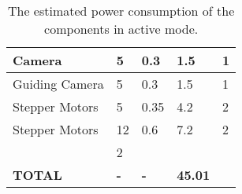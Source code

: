 \begin{center}
\begin{table}[H]
\begin{tabular}{|m{}|m{}|m{}|m{}|m{}|}
Camera                  & 5                               & 0.3                                 & 1.5                          & 1                 \\ \hline
Guiding Camera          & 5                               & 0.3                                 & 1.5                          & 1                 \\ \hline
Stepper Motors            & 5                              & 0.35                                & 4.2                          & 2                \\ \hline
Stepper Motors            & 12                              & 0.6                                & 7.2                          & 2                 \\ \hline                        & 2                \\ \hline
\textbf{TOTAL}          & \textbf{-}                      & \textbf{-}                   & \textbf{45.01}           &                   \\ \hline
\end{tabular}
\caption{The estimated power consumption of the components in active mode.}
\end{table}
\label{tab: power consumption}
\end{center}




\raggedbottom